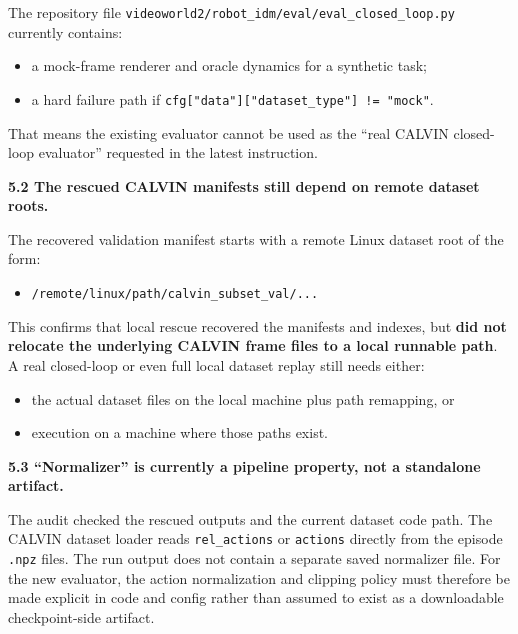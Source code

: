 \documentclass[11pt]{article}
\begin{document}
The repository file \texttt{videoworld2/robot\_idm/eval/eval\_closed\_loop.py} currently contains:
\begin{itemize}
  \item a mock-frame renderer and oracle dynamics for a synthetic task;
  \item a hard failure path if \texttt{cfg["data"]["dataset\_type"] != "mock"}.
\end{itemize}

That means the existing evaluator cannot be used as the ``real CALVIN closed-loop evaluator'' requested in the latest instruction.

\textbf{5.2 The rescued CALVIN manifests still depend on remote dataset roots.}

The recovered validation manifest starts with a remote Linux dataset root of the form:
\begin{itemize}
  \item \texttt{/remote/linux/path/calvin\_subset\_val/...}
\end{itemize}

This confirms that local rescue recovered the manifests and indexes, but \textbf{did not relocate the underlying CALVIN frame files to a local runnable path}. A real closed-loop or even full local dataset replay still needs either:
\begin{itemize}
  \item the actual dataset files on the local machine plus path remapping, or
  \item execution on a machine where those paths exist.
\end{itemize}

\textbf{5.3 ``Normalizer'' is currently a pipeline property, not a standalone artifact.}

The audit checked the rescued outputs and the current dataset code path. The CALVIN dataset loader reads \texttt{rel\_actions} or \texttt{actions} directly from the episode \texttt{.npz} files. The run output does not contain a separate saved normalizer file. For the new evaluator, the action normalization and clipping policy must therefore be made explicit in code and config rather than assumed to exist as a downloadable checkpoint-side artifact.
\end{document}
